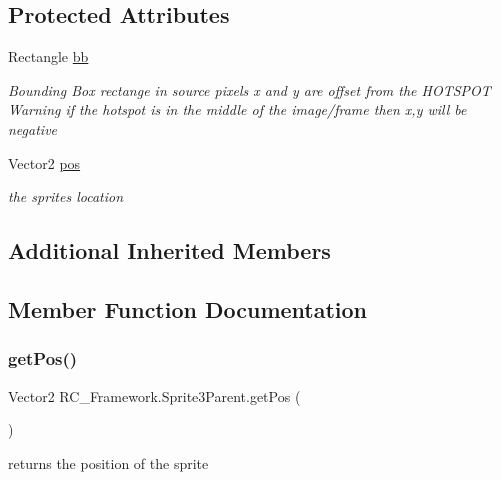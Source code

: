 \subsection*{Protected Attributes}
\begin{DoxyCompactItemize}
\item 
Rectangle \mbox{\hyperlink{class_r_c___framework_1_1_sprite3_parent_af4043faa686325df81a690475feed4d8}{bb}}
\begin{DoxyCompactList}\small\item\em Bounding Box rectange in source pixels x and y are offset from the H\+O\+T\+S\+P\+OT Warning if the hotspot is in the middle of the image/frame then x,y will be negative \end{DoxyCompactList}\item 
Vector2 \mbox{\hyperlink{class_r_c___framework_1_1_sprite3_parent_af83a86a2944aec373fe87a170f3d7e2c}{pos}}
\begin{DoxyCompactList}\small\item\em the sprites location \end{DoxyCompactList}\end{DoxyCompactItemize}
\subsection*{Additional Inherited Members}


\subsection{Member Function Documentation}
\mbox{\label{class_r_c___framework_1_1_sprite3_parent_aabeda600912d35738cdb6de98a40282a}} 
\subsubsection{\texorpdfstring{get\+Pos()}{getPos()}}
{\footnotesize\ttfamily Vector2 R\+C\+\_\+\+Framework.\+Sprite3\+Parent.\+get\+Pos (\begin{DoxyParamCaption}{ }\end{DoxyParamCaption})}



returns the position of the sprite 

